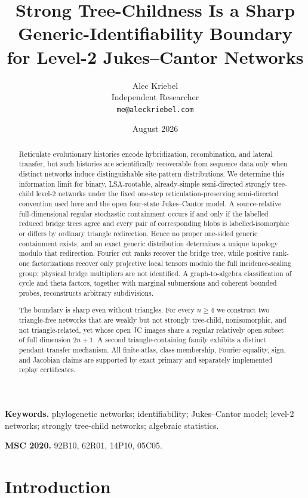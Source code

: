 \documentclass[11pt]{article}
\title{Strong Tree-Childness Is a Sharp Generic-Identifiability Boundary\\
for Level-2 Jukes--Cantor Networks}
\author{Alec Kriebel\\
\small Independent Researcher\\
\small \texttt{me@aleckriebel.com}}
\date{August 2026}
\theoremstyle{remark}
\begin{document}
\maketitle

\begin{abstract}
Reticulate evolutionary histories encode hybridization, recombination, and
lateral transfer, but such histories are scientifically recoverable from
sequence data only when distinct networks induce distinguishable site-pattern
distributions.  We determine this information limit for binary, LSA-rootable,
already-simple semi-directed strongly tree-child level-2 networks under the
fixed one-step reticulation-preserving semi-directed convention used here
and the open four-state Jukes--Cantor model.  A source-relative
full-dimensional regular stochastic containment occurs if and only if the
labelled reduced bridge trees agree and every pair of corresponding blobs is
labelled-isomorphic or differs by ordinary triangle redirection.  Hence no
proper one-sided generic containment exists, and an exact generic distribution
determines a unique topology modulo that redirection.  Fourier cut ranks
recover the bridge tree, while positive rank-one factorizations recover only
projective local tensors modulo the full incidence-scaling group; physical
bridge multipliers are not identified.  A graph-to-algebra classification of
cycle and theta factors, together with marginal submersions and coherent
bounded probes, reconstructs arbitrary subdivisions.

The boundary is sharp even without triangles.  For every $n\ge4$ we construct
two triangle-free networks that are weakly but not strongly tree-child,
nonisomorphic, and not triangle-related, yet whose open JC images share a
regular relatively open subset of full dimension $2n+1$.  A second
triangle-containing family exhibits a distinct pendant-transfer mechanism.
All finite-atlas, class-membership, Fourier-equality, sign, and Jacobian claims
are supported by exact primary and separately implemented replay
certificates.
\end{abstract}

\noindent\textbf{Keywords.} phylogenetic networks; identifiability;
Jukes--Cantor model; level-2 networks; strongly tree-child networks;
algebraic statistics.

\medskip
\noindent\textbf{MSC 2020.} 92B10, 62R01, 14P10, 05C05.

\section{Introduction}
\end{document}
